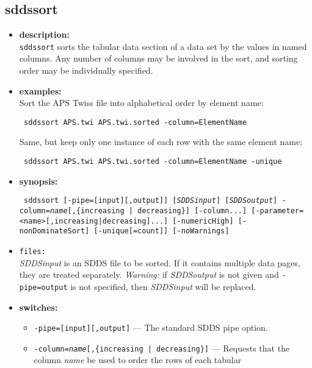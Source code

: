 \newpage
\subsection{sddssort}
\label{sddssort}

\begin{itemize}
\item {\bf description:} \hspace*{1mm}\\
\verb|sddssort| sorts the tabular data section of a data set by the values in named columns.
Any number of columns may be involved in the sort, and sorting order may be individually specified.
\item {\bf examples:} \\
Sort the APS Twiss file into alphabetical order by element name:
\begin{flushleft}{\tt
sddssort APS.twi APS.twi.sorted -column=ElementName
}\end{flushleft}
Same, but keep only one instance of each row with the same element name:
\begin{flushleft}{\tt
sddssort APS.twi APS.twi.sorted -column=ElementName -unique
}\end{flushleft}
\item {\bf synopsis:} \\
\begin{flushleft}{\tt
sddssort [-pipe=[input][,output]] [{\em SDDSinput}] [{\em SDDSoutput}] 
-column={\em name}[,\{increasing | decreasing\}] [-column...] 
[-parameter=<name>[,{increasing|decreasing}]...]
[-numericHigh] [-nonDominateSort] 
[-unique[=count]] [-noWarnings]
}\end{flushleft}
\item {\tt files:}\\
{\em SDDSinput} is an SDDS file to be sorted.  If it contains multiple data pages, they
are treated separately.  {\em Warning: } if {\em SDDSoutput} is not given and {\tt -pipe=output}  is not
specified, then {\em SDDSinput} will be replaced.
\item {\bf switches:}
    \begin{itemize}
    \item {\tt -pipe=[input][,output]} --- The standard SDDS pipe option.
    \item {\tt -column={\em name}[,\{increasing | decreasing\}]} --- Requests that the column 
        {\em name} be used to order the rows of each tabular

\end{itemize}
\end{itemize}

